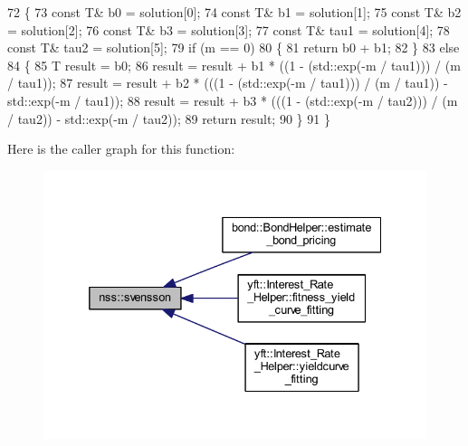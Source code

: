 \begin{DoxyCode}
72     \{
73         \textcolor{keyword}{const} T& b0 = solution[0];
74         \textcolor{keyword}{const} T& b1 = solution[1];
75         \textcolor{keyword}{const} T& b2 = solution[2];
76         \textcolor{keyword}{const} T& b3 = solution[3];
77         \textcolor{keyword}{const} T& tau1 = solution[4];
78         \textcolor{keyword}{const} T& tau2 = solution[5];
79         \textcolor{keywordflow}{if} (m == 0)
80         \{
81             \textcolor{keywordflow}{return} b0 + b1;
82         \}
83         \textcolor{keywordflow}{else}
84         \{
85             T result = b0;
86             result = result + b1 * ((1 - (std::exp(-m / tau1))) / (m / tau1));
87             result = result + b2 * (((1 - (std::exp(-m / tau1))) / (m / tau1)) - std::exp(-m / tau1));
88             result = result + b3 * (((1 - (std::exp(-m / tau2))) / (m / tau2)) - std::exp(-m / tau2));
89             \textcolor{keywordflow}{return} result;
90         \}
91     \}
\end{DoxyCode}
Here is the caller graph for this function\+:
\nopagebreak
\begin{figure}[H]
\begin{center}
\leavevmode
\includegraphics[width=332pt]{namespacenss_a71aad246261afa16f8bb1a4057570d4b_icgraph}
\end{center}
\end{figure}

